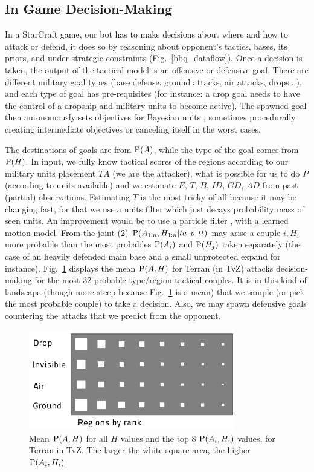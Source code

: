 \subsection{In Game Decision-Making}
In a StarCraft game, our bot has to make decisions about where and how to attack or defend, it does so by reasoning about opponent's tactics, bases, its priors, and under strategic constraints (Fig.~\ref{bbq_dataflow}). Once a decision is taken, the output of the tactical model is an offensive or defensive goal. There are different military goal types (base defense, ground attacks, air attacks, drops...), and each type of goal has pre-requisites (for instance: a drop goal needs to have the control of a dropship and military units to become active). The spawned goal then autonomously sets objectives for Bayesian units \cite{SYNNAEVE:Micro}, sometimes procedurally creating intermediate objectives or canceling itself in the worst cases. 

The destinations of goals are from $\mathrm{P}(A)$, while the type of the goal comes from $\mathrm{P}(H)$. In input, we fully know tactical scores of the regions according to our military units placement $TA$ (we are the attacker), what is possible for us to do $P$ (according to units available) and we estimate $E$, $T$, $B$, $ID$, $GD$, $AD$ from past (partial) observations. Estimating $T$ is the most tricky of all because it may be changing fast, for that we use a units filter which just decays probability mass of seen units. An improvement would be to use a particle filter \cite{Weber2011aiide}, with a learned motion model. From the joint (2) $\mathrm{P}(A_{1:n},H_{1:n}|ta,p,tt)$ may arise a couple $i,H_i$ more probable than the most probables $\mathrm{P}(A_i)$ and $\mathrm{P}(H_j)$ taken separately (the case of an heavily defended main base and a small unprotected expand for instance). Fig.~\ref{fig:WhereHow} displays the mean $\mathrm{P}(A,H)$ for Terran (in TvZ) attacks decision-making for the most 32 probable type/region tactical couples. It is in this kind of landscape (though more steep because Fig.~\ref{fig:WhereHow} is a mean) that we sample (or pick the most probable couple) to take a decision. Also, we may spawn defensive goals countering the attacks that we predict from the opponent.

\begin{figure}[htp]
\centerline{\includegraphics[width=9cm]{images/WhereHow_T_TvZ_light.png}}
\caption{Mean $\mathrm{P}(A,H)$ for all $H$ values and the top 8 $\mathrm{P}(A_i,H_i)$ values, for Terran in TvZ. The larger the white square area, the higher $\mathrm{P}(A_i,H_i)$.}
\label{fig:WhereHow}
\end{figure}

